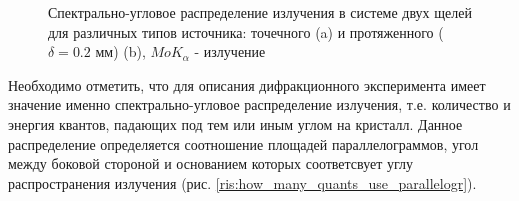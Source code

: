 \begin{figure}[H]
  \centering
  \hfill
  \caption{Спектрально-угловое распределение излучения в системе двух щелей для различных типов источника: точечного (a)
  и протяженного ($\delta = 0.2$ мм) (b), $MoK_{\alpha}$ - излучение}
  \label{ris:sourc_map}
\end{figure}

Необходимо отметить, что для описания дифракционного эксперимента имеет значение именно
спектрально-угловое распределение излучения, т.е. количество и энергия квантов, падающих под тем
или иным углом на кристалл. Данное распределение определяется соотношение площадей параллелограммов,
угол между боковой стороной и основанием которых соответсвует углу распространения излучения
(рис. \ref{ris:how_many_quants_use_parallelogr}).

